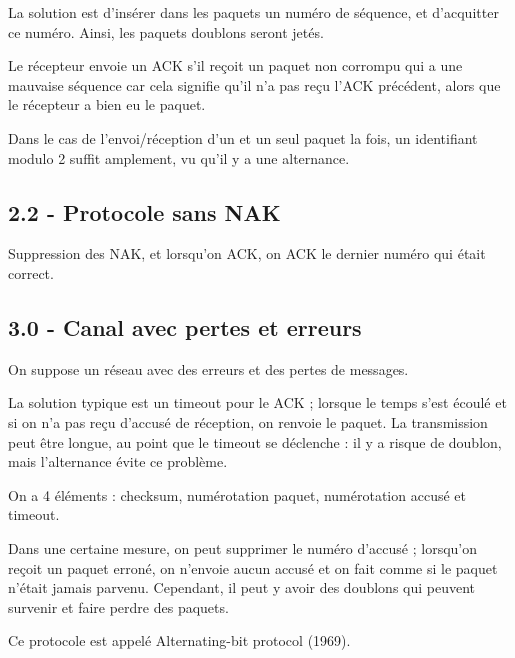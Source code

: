 	La solution est d'insérer dans les paquets un numéro de séquence, et d'acquitter ce numéro. Ainsi, les paquets doublons seront jetés.
	
	
	
	
	Le récepteur envoie un ACK s'il reçoit un paquet non corrompu qui a une mauvaise séquence car cela signifie qu'il n'a pas reçu l'ACK précédent, alors que le récepteur a bien eu le paquet.
	
	Dans le cas de l'envoi/réception d'un et un seul paquet  la fois, un identifiant modulo 2 suffit amplement, vu qu'il y a une alternance.
	
	\subsection{2.2 - Protocole sans NAK}
	
	Suppression des NAK, et lorsqu'on ACK, on ACK le dernier numéro qui était correct.
	
	
	
	\subsection{3.0 - Canal avec pertes et erreurs}
	
	On suppose un réseau avec des erreurs et des pertes de messages.

	
	La solution typique est un timeout pour le ACK ; lorsque  le temps s'est écoulé et si on n'a pas reçu d'accusé de réception, on renvoie le paquet.
	La transmission peut être longue, au point que le timeout se déclenche : il y a risque de doublon, mais l'alternance évite ce problème.		

On a 4 éléments : checksum, numérotation paquet, numérotation accusé et timeout.
	
Dans une certaine mesure, on peut supprimer le numéro d'accusé ; lorsqu'on reçoit un paquet erroné, on n'envoie aucun accusé et on fait comme si le paquet n'était jamais parvenu. Cependant, il peut y avoir des doublons qui peuvent survenir et faire perdre des paquets.
		
	
	
	Ce protocole est appelé Alternating-bit protocol (1969).

	
